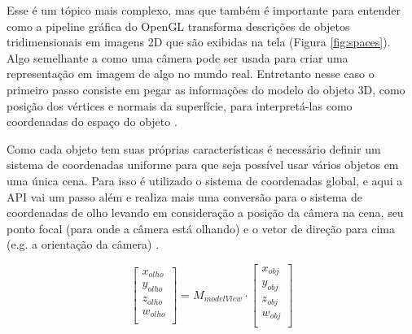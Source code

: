 Esse é um tópico mais complexo, mas que também é importante para entender como a pipeline gráfica do OpenGL transforma descrições de objetos tridimensionais em imagens 2D que são exibidas na tela (Figura \ref{fig:spaces}). Algo semelhante a como uma câmera pode ser usada para criar uma representação em imagem de algo no mundo real. Entretanto nesse caso o primeiro passo consiste em pegar as informações do modelo do objeto 3D, como posição dos vértices e normais da superfície, para interpretá-las como coordenadas do espaço do objeto \cite{GLSLBook}. 

Como cada objeto tem suas próprias características é necessário definir um sistema de coordenadas uniforme para que seja possível usar vários objetos em uma única cena. Para isso é utilizado o sistema de coordenadas global, e aqui a API vai um passo além e realiza mais uma conversão para o sistema de coordenadas de olho levando em consideração a posição da câmera na cena, seu ponto focal (para onde a câmera está olhando) e o vetor de direção para cima (e.g. a orientação da câmera) \cite{GLSLBook}. 

	\begin{equation}
		\begin{bmatrix}
			x_{olho} \\
			y_{olho} \\
			z_{olho} \\
			w_{olho} \\
		\end{bmatrix}
		=
		M_{modelView} \cdot
		\begin{bmatrix}
			x_{obj} \\
			y_{obj} \\
			z_{obj} \\
			w_{obj} \\
		\end{bmatrix}
	\end{equation}

	\begin{figure}[h!]
		\centering
	\end{figure}

